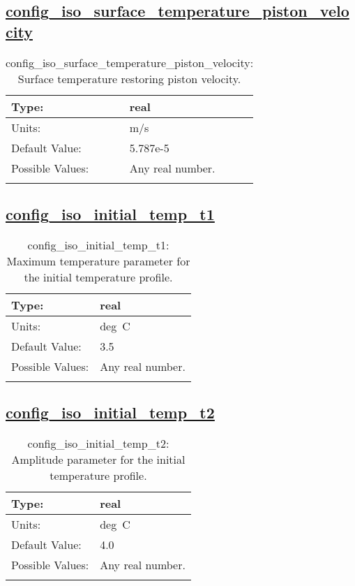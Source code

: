\subsection[config\_iso\_surface\_temperature\_piston\_velocity]{\hyperref[sec:nm_tab_iso]{config\_iso\_surface\_temperature\_piston\_velocity}}
\label{subsec:nm_sec_config_iso_surface_temperature_piston_velocity}
\begin{center}
\begin{longtable}{| p{2.0in} || p{4.0in} |}
    \hline
    Type: & real \\
    \hline
    Units: & \si{m/s} \\
    \hline
    Default Value: & 5.787e-5 \\
    \hline
    Possible Values: & Any real number. \\
    \hline
    \caption{config\_iso\_surface\_temperature\_piston\_velocity: Surface temperature restoring piston velocity.}
\end{longtable}
\end{center}
\subsection[config\_iso\_initial\_temp\_t1]{\hyperref[sec:nm_tab_iso]{config\_iso\_initial\_temp\_t1}}
\label{subsec:nm_sec_config_iso_initial_temp_t1}
\begin{center}
\begin{longtable}{| p{2.0in} || p{4.0in} |}
    \hline
    Type: & real \\
    \hline
    Units: & \si{deg.C} \\
    \hline
    Default Value: & 3.5 \\
    \hline
    Possible Values: & Any real number. \\
    \hline
    \caption{config\_iso\_initial\_temp\_t1: Maximum temperature parameter for the initial temperature profile.}
\end{longtable}
\end{center}
\subsection[config\_iso\_initial\_temp\_t2]{\hyperref[sec:nm_tab_iso]{config\_iso\_initial\_temp\_t2}}
\label{subsec:nm_sec_config_iso_initial_temp_t2}
\begin{center}
\begin{longtable}{| p{2.0in} || p{4.0in} |}
    \hline
    Type: & real \\
    \hline
    Units: & \si{deg.C} \\
    \hline
    Default Value: & 4.0 \\
    \hline
    Possible Values: & Any real number. \\
    \hline
    \caption{config\_iso\_initial\_temp\_t2: Amplitude parameter for the initial temperature profile.}
\end{longtable}
\end{center}
